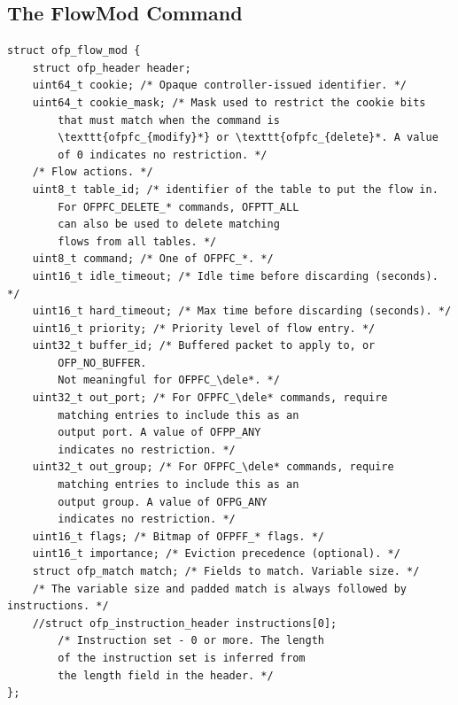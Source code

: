 \documentclass[conference]{sigcomm-alternate}
\newcommand{\dele}{\textbf{delete}\xspace}
\begin{document}
{{

}

\clearpage

\onecolumn

\begin{appendix}

\section{The FlowMod Command}

\begin{lstlisting}
struct ofp_flow_mod {
	struct ofp_header header;
	uint64_t cookie; /* Opaque controller-issued identifier. */
	uint64_t cookie_mask; /* Mask used to restrict the cookie bits
		that must match when the command is
		\texttt{ofpfc_{modify}*} or \texttt{ofpfc_{delete}*. A value
		of 0 indicates no restriction. */
	/* Flow actions. */
	uint8_t table_id; /* identifier of the table to put the flow in.
		For OFPFC_DELETE_* commands, OFPTT_ALL
		can also be used to delete matching
		flows from all tables. */
	uint8_t command; /* One of OFPFC_*. */
	uint16_t idle_timeout; /* Idle time before discarding (seconds). */
	uint16_t hard_timeout; /* Max time before discarding (seconds). */
	uint16_t priority; /* Priority level of flow entry. */
	uint32_t buffer_id; /* Buffered packet to apply to, or
		OFP_NO_BUFFER.
		Not meaningful for OFPFC_\dele*. */
	uint32_t out_port; /* For OFPFC_\dele* commands, require
		matching entries to include this as an
		output port. A value of OFPP_ANY
		indicates no restriction. */
	uint32_t out_group; /* For OFPFC_\dele* commands, require
		matching entries to include this as an
		output group. A value of OFPG_ANY
		indicates no restriction. */
	uint16_t flags; /* Bitmap of OFPFF_* flags. */
	uint16_t importance; /* Eviction precedence (optional). */
	struct ofp_match match; /* Fields to match. Variable size. */
	/* The variable size and padded match is always followed by instructions. */
	//struct ofp_instruction_header instructions[0];
		/* Instruction set - 0 or more. The length
		of the instruction set is inferred from
		the length field in the header. */
};
\end{lstlisting}



\end{appendix}}
\end{document}
